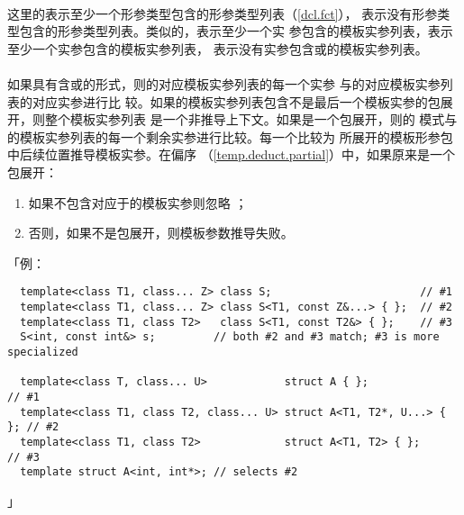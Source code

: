 \mbox{}                                               \\
\mbox{}                                              \\
\mbox{}      \\
\mbox{}                                                     \\
\mbox{}                                                     \\
\mbox{}                                                      \\
这里的表示至少一个形参类型包含的形参类型列表（\ref{dcl.fct}），
\tm{()}表示没有形参类型包含的形参类型列表。类似的，表示至少一个实
参包含的模板实参列表，表示至少一个实参包含的模板实参列表，
\tm{<>}表示没有实参包含或的模板实参列表。

\paragraph{}
如果具有含或的形式，则的对应模板实参列表的每一个实参
与的对应模板实参列表的对应实参进行比
较。如果的模板实参列表包含不是最后一个模板实参的包展开，则整个模板实参列表
是一个非推导上下文。如果是一个包展开，则的
模式与的模板实参列表的每一个剩余实参进行比较。每一个比较为
所展开的模板形参包中后续位置推导模板实参。在偏序
（\ref{temp.deduct.partial}）中，如果原来是一个包展开：
\begin{enumerate}
  \item{如果不包含对应于的模板实参则忽略
    ；}
  \item{否则，如果不是包展开，则模板参数推导失败。}
\end{enumerate}
「例：
\begin{lstlisting}
  template<class T1, class... Z> class S;                       // #1
  template<class T1, class... Z> class S<T1, const Z&...> { };  // #2
  template<class T1, class T2>   class S<T1, const T2&> { };    // #3
  S<int, const int&> s;         // both #2 and #3 match; #3 is more specialized

  template<class T, class... U>            struct A { };                // #1
  template<class T1, class T2, class... U> struct A<T1, T2*, U...> { }; // #2
  template<class T1, class T2>             struct A<T1, T2> { };        // #3
  template struct A<int, int*>; // selects #2
\end{lstlisting}」


